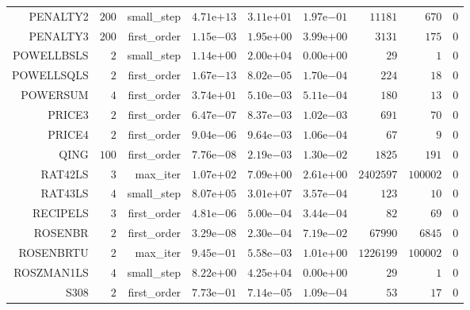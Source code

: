 \begin{longtable}{rrrrrrrrr}
PENALTY2 & \(   200\) & small\_step & \( 4.71\)e\(+13\) & \( 3.11\)e\(+01\) & \( 1.97\)e\(-01\) & \( 11181\) & \(   670\) & \(     0\) \\
PENALTY3 & \(   200\) & first\_order & \( 1.15\)e\(-03\) & \( 1.95\)e\(+00\) & \( 3.99\)e\(+00\) & \(  3131\) & \(   175\) & \(     0\) \\
POWELLBSLS & \(     2\) & small\_step & \( 1.14\)e\(+00\) & \( 2.00\)e\(+04\) & \( 0.00\)e\(+00\) & \(    29\) & \(     1\) & \(     0\) \\
POWELLSQLS & \(     2\) & first\_order & \( 1.67\)e\(-13\) & \( 8.02\)e\(-05\) & \( 1.70\)e\(-04\) & \(   224\) & \(    18\) & \(     0\) \\
POWERSUM & \(     4\) & first\_order & \( 3.74\)e\(+01\) & \( 5.10\)e\(-03\) & \( 5.11\)e\(-04\) & \(   180\) & \(    13\) & \(     0\) \\
PRICE3 & \(     2\) & first\_order & \( 6.47\)e\(-07\) & \( 8.37\)e\(-03\) & \( 1.02\)e\(-03\) & \(   691\) & \(    70\) & \(     0\) \\
PRICE4 & \(     2\) & first\_order & \( 9.04\)e\(-06\) & \( 9.64\)e\(-03\) & \( 1.06\)e\(-04\) & \(    67\) & \(     9\) & \(     0\) \\
QING & \(   100\) & first\_order & \( 7.76\)e\(-08\) & \( 2.19\)e\(-03\) & \( 1.30\)e\(-02\) & \(  1825\) & \(   191\) & \(     0\) \\
RAT42LS & \(     3\) & max\_iter & \( 1.07\)e\(+02\) & \( 7.09\)e\(+00\) & \( 2.61\)e\(+00\) & \(2402597\) & \(100002\) & \(     0\) \\
RAT43LS & \(     4\) & small\_step & \( 8.07\)e\(+05\) & \( 3.01\)e\(+07\) & \( 3.57\)e\(-04\) & \(   123\) & \(    10\) & \(     0\) \\
RECIPELS & \(     3\) & first\_order & \( 4.81\)e\(-06\) & \( 5.00\)e\(-04\) & \( 3.44\)e\(-04\) & \(    82\) & \(    69\) & \(     0\) \\
ROSENBR & \(     2\) & first\_order & \( 3.29\)e\(-08\) & \( 2.30\)e\(-04\) & \( 7.19\)e\(-02\) & \( 67990\) & \(  6845\) & \(     0\) \\
ROSENBRTU & \(     2\) & max\_iter & \( 9.45\)e\(-01\) & \( 5.58\)e\(-03\) & \( 1.01\)e\(+00\) & \(1226199\) & \(100002\) & \(     0\) \\
ROSZMAN1LS & \(     4\) & small\_step & \( 8.22\)e\(+00\) & \( 4.25\)e\(+04\) & \( 0.00\)e\(+00\) & \(    29\) & \(     1\) & \(     0\) \\
S308 & \(     2\) & first\_order & \( 7.73\)e\(-01\) & \( 7.14\)e\(-05\) & \( 1.09\)e\(-04\) & \(    53\) & \(    17\) & \(     0\) \\

\end{longtable}
